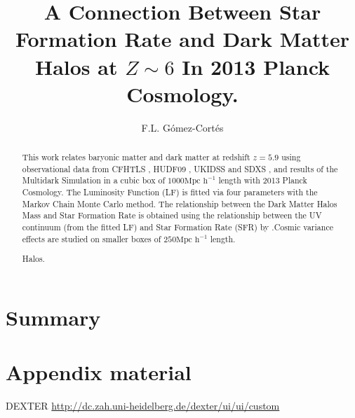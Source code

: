 \documentclass[manuscript]{aastex}
\begin{document}
\title{A Connection Between Star Formation Rate and Dark Matter Halos at 
$Z\sim6$ In 2013 Planck Cosmology.}

\author{F.L. G\'omez-Cort\'es }

\begin{abstract}
This work relates baryonic matter and dark matter at redshift $z=5.9$ using 
observational data from CFHTLS \citep{willott13}, HUDF09 
\citep{bouwens06,bouwens12}, UKIDSS and SDXS \citep{mclure09}, and results of 
the Multidark Simulation \citep{riebe13} in a cubic box of $1000 \textrm{Mpc 
h}^{-1}$ length with 2013 Planck Cosmology. The Luminosity Function (LF) is 
fitted via four parameters with the Markov Chain Monte Carlo method. The 
relationship between the Dark Matter Halos Mass and Star Formation Rate is 
obtained using the relationship between the UV  continuum (from the fitted LF) 
and Star Formation Rate (SFR) by \cite{kennicutt98}.Cosmic variance effects are 
studied on smaller boxes of $250 \textrm{Mpc h}^{-1}$ length.

Halos.
\end{abstract}











\section{Summary}


\acknowledgments
%
\appendix

\section{Appendix material}
DEXTER \url{http://dc.zah.uni-heidelberg.de/dexter/ui/ui/custom}


\end{document}
